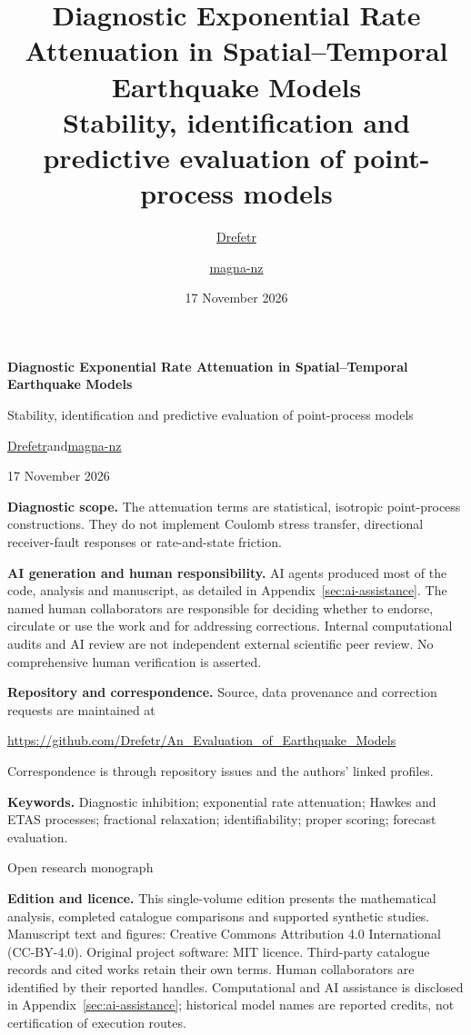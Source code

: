 \documentclass[11pt,a4paper,oneside,openany]{report}
\title{Diagnostic Exponential Rate Attenuation in Spatial--Temporal Earthquake Models\\[12pt]\large Stability, identification and predictive evaluation of point-process models}
\author{\href{https://github.com/Drefetr}{Drefetr} \and \href{https://github.com/magna-nz}{magna-nz}}
\date{17 November 2026}
\begin{document}
\hypersetup{pageanchor=false}
\begin{titlepage}
\centering
\vspace*{1cm}
{\LARGE\bfseries Diagnostic Exponential Rate Attenuation in Spatial--Temporal Earthquake Models\par}
\vspace{0.6cm}
{\large Stability, identification and predictive evaluation of point-process models\par}
\vspace{1cm}
{\large \href{https://github.com/Drefetr}{Drefetr}\quad and\quad \href{https://github.com/magna-nz}{magna-nz}\par}
\vspace{0.4cm}
17 November 2026\par
\vspace{0.8cm}
\begin{minipage}{0.92\textwidth}
\textbf{Diagnostic scope.} The attenuation terms are statistical, isotropic point-process constructions. They do not implement Coulomb stress transfer, directional receiver-fault responses or rate-and-state friction.\par\medskip
\textbf{AI generation and human responsibility.} AI agents produced most of the code, analysis and manuscript, as detailed in Appendix~\ref{sec:ai-assistance}. The named human collaborators are responsible for deciding whether to endorse, circulate or use the work and for addressing corrections. Internal computational audits and AI review are not independent external scientific peer review. No comprehensive human verification is asserted.\par\medskip
\textbf{Repository and correspondence.} Source, data provenance and correction requests are maintained at\par\smallskip
\url{https://github.com/Drefetr/An_Evaluation_of_Earthquake_Models}\par\smallskip
Correspondence is through repository issues and the authors' linked profiles.\par\medskip
\textbf{Keywords.} Diagnostic inhibition; exponential rate attenuation; Hawkes and ETAS processes; fractional relaxation; identifiability; proper scoring; forecast evaluation.
\end{minipage}
\vfill
{\small Open research monograph\par}
\end{titlepage}
\noindent\textbf{Edition and licence.} This single-volume edition presents the mathematical analysis, completed catalogue comparisons and supported synthetic studies. Manuscript text and figures: Creative Commons Attribution 4.0 International (CC-BY-4.0). Original project software: MIT licence. Third-party catalogue records and cited works retain their own terms. Human collaborators are identified by their reported handles. Computational and AI assistance is disclosed in Appendix~\ref{sec:ai-assistance}; historical model names are reported credits, not certification of execution routes.
\end{document}

